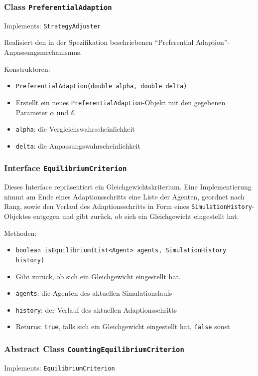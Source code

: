 \documentclass[parskip=full,11pt]{scrartcl}
\begin{document}
\subsubsection{Class \texttt{PreferentialAdaption}}
Implements: \texttt{StrategyAdjuster}

Realisiert den in der Spezifikation beschriebenen \enquote{Preferential Adaption}-Anpassungsmechanismus.

Konstruktoren:
\begin{itemize}\itemsep -10pt
\item \texttt{PreferentialAdaption(double alpha, double delta)}
\item[] Erstellt ein neues \texttt{PreferentialAdaption}-Objekt mit den gegebenen Parameter \(\alpha\) und \(\delta\).
\item[] \texttt{alpha}: die Vergleichswahrscheinlichkeit
\item[] \texttt{delta}: die Anpassungswahrscheinlichkeit
\end{itemize}

\subsubsection{Interface \texttt{EquilibriumCriterion}}
Dieses Interface repräsentiert ein Gleichgewichtskriterium. Eine Implementierung nimmt am Ende eines Adaptionsschritts eine Liste der Agenten, geordnet nach Rang, sowie den Verlauf des Adaptionsschritts in Form eines \texttt{SimulationHistory}-Objektes entgegen und gibt zurück, ob sich ein Gleichgewicht eingestellt hat.

Methoden:
\begin{itemize}\itemsep -10pt
\item \texttt{boolean isEquilibrium(List<Agent> agents, SimulationHistory history)}
\item[] Gibt zurück, ob sich ein Gleichgewicht eingestellt hat.
\item[] \texttt{agents}: die Agenten des aktuellen Simulationslaufs
\item[] \texttt{history}: der Verlauf des aktuellen Adaptionsschritts
\item[] Returns: \texttt{true}, falls sich ein Gleichgewicht eingestellt hat, \texttt{false} sonst
\end{itemize}

\subsubsection{Abstract Class \texttt{CountingEquilibriumCriterion}}
Implements: \texttt{EquilibriumCriterion}
\end{document}
